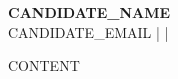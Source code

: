 \documentclass[11pt,a4paper]{article}
\begin{document}
\begin{center}
{\LARGE\bfseries {{CANDIDATE_NAME}}}\\[4pt]
{\small {{CANDIDATE_EMAIL}} \quad |  \quad | }
\end{center}

\vspace{8pt}

{{CONTENT}}
\end{document}
